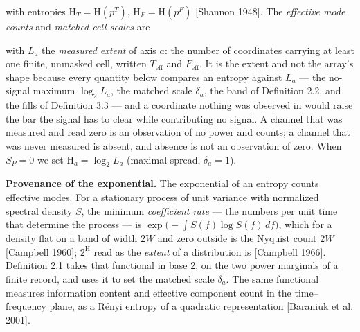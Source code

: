 \documentclass[10pt,letterpaper,twocolumn]{article}
\begin{document}
with entropies \(\mathrm{H}_T=\mathrm{H}(p^{T})\), \(\mathrm{H}_F=\mathrm{H}(p^{F})\) {[}Shannon 1948{]}. The \emph{effective mode counts} and \emph{matched cell scales} are


with \(L_a\) the \emph{measured extent} of axis \(a\): the number of coordinates carrying at least one finite, unmasked cell, written \(T_{\mathrm{eff}}\) and \(F_{\mathrm{eff}}\). It is the extent and not the array's shape because every quantity below compares an entropy against \(L_a\) --- the no-signal maximum \(\log_2 L_a\), the matched scale \(\delta_a\), the band of Definition 2.2, and the fills of Definition 3.3 --- and a coordinate nothing was observed in would raise the bar the signal has to clear while contributing no signal. A channel that was measured and read zero is an observation of no power and counts; a channel that was never measured is absent, and absence is not an observation of zero. When \(S_{\!P}=0\) we set \(\mathrm{H}_a=\log_2 L_a\) (maximal spread, \(\delta_a=1\)).

\textbf{Provenance of the exponential.} The exponential of an entropy counts effective modes. For a stationary process of unit variance with normalized spectral density \(S\), the minimum \emph{coefficient rate} --- the numbers per unit time that determine the process --- is \(\exp\!\big(-\!\int S(f)\log S(f)\,df\big)\), which for a density flat on a band of width \(2W\) and zero outside is the Nyquist count \(2W\) {[}Campbell 1960{]}; \(2^{\mathrm H}\) read as the \emph{extent} of a distribution is {[}Campbell 1966{]}. Definition 2.1 takes that functional in base 2, on the two power marginals of a finite record, and uses it to set the matched scale \(\delta_a\). The same functional measures information content and effective component count in the time--frequency plane, as a Rényi entropy of a quadratic representation {[}Baraniuk et al. 2001{]}.
\end{document}

